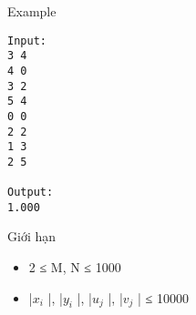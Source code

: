 Example
\begin{verbatim}
Input:
3 4
4 0
3 2
5 4
0 0
2 2
1 3
2 5

Output:
1.000
\end{verbatim}
Giới hạn
\begin{itemize}
	\item     2 ≤ M, N ≤ 1000   
	\item     |$x_{i}$    |, |$y_{i}$    |, |$u_{j}$    |, |$v_{j}$    | ≤ 10000   
\end{itemize}